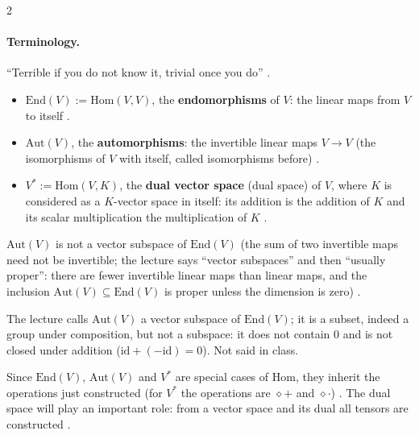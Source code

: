 \begin{paracol}{2}
\paragraph{Terminology.} ``Terrible if you do not know it, trivial once you do'' .
\begin{definition}\label{def:te-end}
\begin{itemize}
  \item $\mathrm{End}(V):=\mathrm{Hom}(V,V)$, the \textbf{endomorphisms} of $V$: the linear maps from $V$ to itself .
  \item $\mathrm{Aut}(V)$, the \textbf{automorphisms}: the invertible linear maps $V\to V$ (the isomorphisms of $V$ with itself, called isomorphisms before) .
  \item $V^*:=\mathrm{Hom}(V,K)$, the \textbf{dual vector space} (dual space) of $V$, where $K$ is considered as a $K$-vector space in itself: its addition is the addition of $K$ and its scalar multiplication the multiplication of $K$ .
\end{itemize}
\end{definition}
$\mathrm{Aut}(V)$ is not a vector subspace of $\mathrm{End}(V)$ (the sum of two invertible maps need not be invertible; the lecture says ``vector subspaces'' and then ``usually proper'': there are fewer invertible linear maps than linear maps, and the inclusion $\mathrm{Aut}(V)\subseteq\mathrm{End}(V)$ is proper unless the dimension is zero) .
\begin{coursenote}
The lecture calls $\mathrm{Aut}(V)$ a vector subspace of $\mathrm{End}(V)$; it is a subset, indeed a group under composition, but not a subspace: it does not contain $0$ and is not closed under addition ($\mathrm{id}+(-\mathrm{id})=0$). Not said in class.
\end{coursenote}
Since $\mathrm{End}(V)$, $\mathrm{Aut}(V)$ and $V^*$ are special cases of $\mathrm{Hom}$, they inherit the operations just constructed (for $V^*$ the operations are $\diamond+$ and $\diamond\cdot$) . The dual space will play an important role: from a vector space and its dual all tensors are constructed .


\end{paracol}
